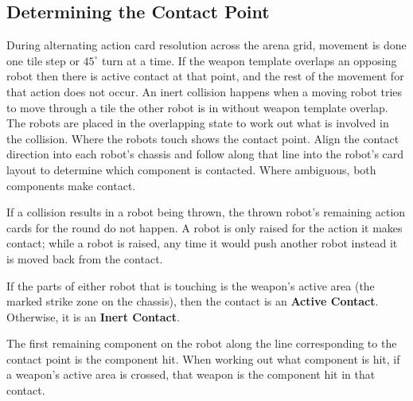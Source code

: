 \documentclass[11pt,a4paper]{article}
\begin{document}
\subsection{Determining the Contact Point}

During alternating action card resolution across the arena grid, movement is done one tile step or $45^\circ$ turn at a time. If the weapon template overlaps an opposing robot then there is active contact at that point, and the rest of the movement for that action does not occur. An inert collision happens when a moving robot tries to move through a tile the other robot is in without weapon template overlap. The robots are placed in the overlapping state to work out what is involved in the collision. Where the robots touch shows the contact point. Align the contact direction into each robot's chassis and follow along that line into the robot's card layout to determine which component is contacted. Where ambiguous, both components make contact.

If a collision results in a robot being thrown, the thrown robot's remaining action cards for the round do not happen. A robot is only raised for the action it makes contact; while a robot is raised, any time it would push another robot instead it is moved back from the contact.

If the parts of either robot that is touching is the weapon's active area (the marked strike zone on the chassis), then the contact is an \textbf{Active Contact}. Otherwise, it is an \textbf{Inert Contact}.

The first remaining component on the robot along the line corresponding to the contact point is the component hit. When working out what component is hit, if a weapon's active area is crossed, that weapon is the component hit in that contact.
\end{document}
